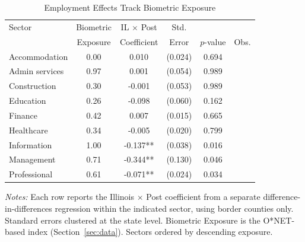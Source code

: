 \begin{table}[htbp]
\centering
\caption{Employment Effects Track Biometric Exposure}
\label{tab:sectors}
\begin{tabular}{lccccc}
\toprule
Sector & Biometric & IL $\times$ Post & Std. & & \\
 & Exposure & Coefficient & Error & $p$-value & Obs. \\
\midrule
Accommodation & 0.00 & 0.010 & (0.024) & 0.694 & \\
Admin services & 0.97 & 0.001 & (0.054) & 0.989 & \\
Construction & 0.30 & -0.001 & (0.053) & 0.989 & \\
Education & 0.26 & -0.098 & (0.060) & 0.162 & \\
Finance & 0.42 & 0.007 & (0.015) & 0.665 & \\
Healthcare & 0.34 & -0.005 & (0.020) & 0.799 & \\
Information & 1.00 & -0.137** & (0.038) & 0.016 & \\
Management & 0.71 & -0.344** & (0.130) & 0.046 & \\
Professional & 0.61 & -0.071** & (0.024) & 0.034 & \\
\bottomrule
\end{tabular}
\begin{tablenotes}[flushleft]
\small
\item \textit{Notes:} Each row reports the Illinois $\times$ Post coefficient from a separate difference-in-differences regression within the indicated sector, using border counties only. Standard errors clustered at the state level. Biometric Exposure is the O*NET-based index (Section~\ref{sec:data}). Sectors ordered by descending exposure.
\end{tablenotes}
\end{table}
